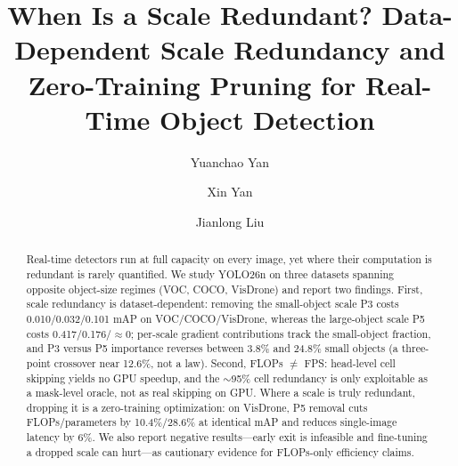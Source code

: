 \documentclass[a4paper,fleqn]{cas-dc}
\begin{document}
\let\WriteBookmarks\relax
\def\floatpagepagefraction{1}
\def\textpagefraction{.001}


\title[mode=title]{When Is a Scale Redundant? Data-Dependent Scale Redundancy and Zero-Training Pruning for Real-Time Object Detection}

\author[1]{Yuanchao Yan}
\cormark[1]

\author[1]{Xin Yan}

\author[1]{Jianlong Liu}



\begin{abstract}
Real-time detectors run at full capacity on every image, yet where their computation is redundant is rarely quantified. We study YOLO26n on three datasets spanning opposite object-size regimes (VOC, COCO, VisDrone) and report two findings. First, scale redundancy is dataset-dependent: removing the small-object scale P3 costs 0.010/0.032/0.101 mAP on VOC/COCO/VisDrone, whereas the large-object scale P5 costs 0.417/0.176/$\approx$0; per-scale gradient contributions track the small-object fraction, and P3 versus P5 importance reverses between 3.8\% and 24.8\% small objects (a three-point crossover near 12.6\%, not a law). Second, FLOPs $\neq$ FPS: head-level cell skipping yields no GPU speedup, and the $\sim$95\% cell redundancy is only exploitable as a mask-level oracle, not as real skipping on GPU. Where a scale is truly redundant, dropping it is a zero-training optimization: on VisDrone, P5 removal cuts FLOPs/parameters by 10.4\%/28.6\% at identical mAP and reduces single-image latency by 6\%. We also report negative results---early exit is infeasible and fine-tuning a dropped scale can hurt---as cautionary evidence for FLOPs-only efficiency claims.
\end{abstract}
\end{document}
